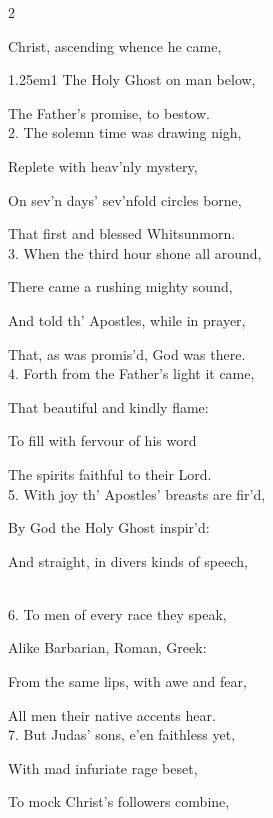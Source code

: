 \begin{paracol}{2}
\sloppy

\mattinsInvitatoryHymn\label{WhitsundayInvitatoryHymn}

 Christ, ascending whence he came,

\begin{hangparas}{1.25em}{1}
The Holy Ghost on man below,

The Father's promise, to bestow.\\

2. The solemn time was drawing nigh,

Replete with heav'nly mystery,

On sev'n days' sev'nfold circles borne,

That first and blessed Whitsunmorn.\\

3. When the third hour shone all around,

There came a rushing mighty sound,

And told th' Apostles, while in prayer,

That, as was promis'd, God was there.\\

4. Forth from the Father's light it came,

That beautiful and kindly flame:

To fill with fervour of his word

The spirits faithful to their Lord.\\

5. With joy th' Apostles' breasts are fir'd,

By God the Holy Ghost inspir'd:

And straight, in divers kinds of speech,

\\

6. To men of every race they speak,

Alike Barbarian, Roman, Greek:

From the same lips, with awe and fear,

All men their native accents hear.\\

7. But Judas' sons, e'en faithless yet,

With mad infuriate rage beset,

To mock Christ's followers combine,


\end{hangparas}
\end{paracol}
